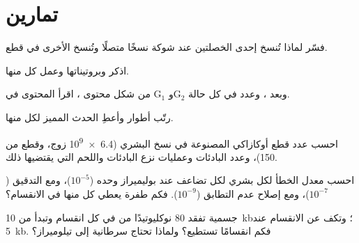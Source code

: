 \section{تمارين}

\begin{exercise}[$\star$]\label{exo:b1:replication-mitosis:1}
فسّر لماذا تُنسخ إحدى الخصلتين عند شوكة نسخًا متصلًا وتُنسخ الأخرى في
قطع.
\end{exercise}

\begin{exercise}[$\star$]\label{exo:b1:replication-mitosis:2}
اذكر   وبروتيناتها وعمل كل منها.
\end{exercise}

\begin{exercise}[$\star$]\label{exo:b1:replication-mitosis:3}
من شكل محتوى ، اقرأ المحتوى في G$_1$ وG$_2$ وبعد ،
وعدد  في كل حالة.
\end{exercise}

\begin{exercise}[$\star$]\label{exo:b1:replication-mitosis:4}
رتّب أطوار  وأعطِ الحدث المميز لكل منها.
\end{exercise}

\begin{exercise}[$\star\star$]\label{exo:b1:replication-mitosis:5}
احسب عدد قطع أوكازاكي المصنوعة في نسخ  البشري
(\num{6.4e9} زوج، وقطع من \qty{150}{})، وعدد البادئات وعمليات نزع
البادئات واللحم التي يقتضيها ذلك.
\end{exercise}

\begin{exercise}[$\star\star$]\label{exo:b1:replication-mitosis:6}
احسب معدل الخطأ لكل  بشري لكل تضاعف عند بوليميراز وحده
($10^{-5}$)، ومع التدقيق ($10^{-7}$)، ومع إصلاح عدم التطابق
($10^{-9}$). فكم طفرة يعطي كل منها في الانقسام؟
\end{exercise}

\begin{exercise}[$\star\star$]\label{exo:b1:replication-mitosis:7}
 جسمية تفقد \qty{80}{} نوكليوتيدًا من  في كل انقسام
وتبدأ من \qty{10}{kb}؛ وتكف عن الانقسام عند \qty{5}{kb}. فكم انقسامًا
تستطيع؟ ولماذا تحتاج  سرطانية إلى تيلوميراز؟
\end{exercise}

